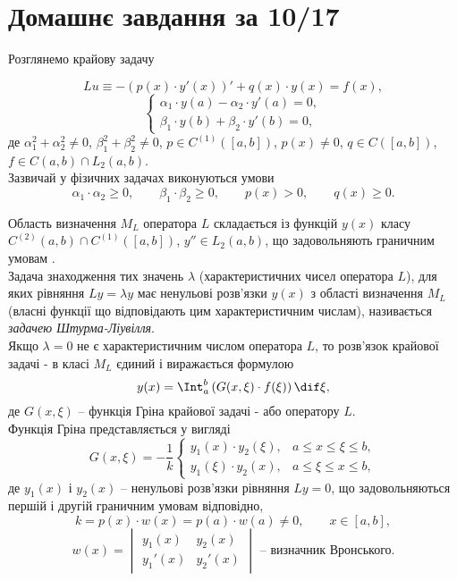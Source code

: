 \setcounter{section}{5}

\section{Домашнє завдання за 10/17}

Розглянемо крайову задачу

\begin{equation}
    \label{eq:6.1}
    Lu \equiv -(p(x) \cdot y'(x))' + q(x) \cdot y(x) = f(x),
\end{equation}
\begin{equation}
    \label{eq:6.2}
    \left\{
        \begin{aligned}
            \alpha_1 \cdot y(a) - \alpha_2 \cdot y'(a) = 0, \\
            \beta_1 \cdot y(b) + \beta_2 \cdot y'(b) = 0,
        \end{aligned}
    \right.
\end{equation}
де $\alpha_1^2 + \alpha_2^2 \ne 0$, $\beta_1^2 + \beta_2^2 \ne 0$, $p \in C^{(1)}([a,b])$, $p(x) \ne 0$, $q \in C([a, b])$, $f \in C(a, b) \cap L_2(a,b)$. \\

Зазвичай у фізичних задачах виконуються умови 
\[ \alpha_1 \cdot \alpha_2 \ge 0, \qquad \beta_1 \cdot \beta_2 \ge 0, \qquad p(x) > 0, \qquad q(x) \ge 0. \]

Область визначення $M_L$ оператора $L$ складається із функцій $y(x)$ класу $C^{(2)}(a,b) \cap C^{(1)}([a,b])$, $y'' \in L_2(a,b)$, що задовольняють граничним умовам . \\

Задача знаходження тих значень $\lambda$ (характеристичних чисел оператора $L$), для яких рівняння $Ly = \lambda y$ має ненульові розв'язки $y(x)$ з області визначення $M_L$ (власні функції що відповідають цим характеристичним числам), називається \textit{задачею Штурма-Ліувілля}. \\

Якщо $\lambda = 0$ не є характеристичним числом оператора $L$, то розв'язок крайової задачі - в класі $M_L$ єдиний і виражається формулою 
\[ y(x) = \Int_a^b \left(G(x, \xi) \cdot f(\xi)\right) \dif \xi,\]
де $G(x, \xi)$ -- функція Гріна крайової задачі - або оператору $L$. \\

Функція Гріна представляється у вигляді 
\[G(x,\xi) = -\dfrac1k \begin{cases} y_1(x) \cdot y_2(\xi), & a\le x \le \xi \le b, \\ y_1(\xi) \cdot y_2(x), & a \le \xi \le x \le b, \end{cases}\]
де $y_1(x)$ і $y_2(x)$ -- ненульові розв'язки рівняння $Ly = 0$, що задовольняються першій і другій граничним умовам  відповідно,
\[ k = p(x) \cdot w(x) = p(a) \cdot w(a) \ne 0, \qquad x \in [a, b],\]
\[ w(x) = \begin{vmatrix} y_1(x) & y_2(x) \\ y_1'(x) & y_2'(x) \end{vmatrix}\text{ -- визначник Вронського.}\]

